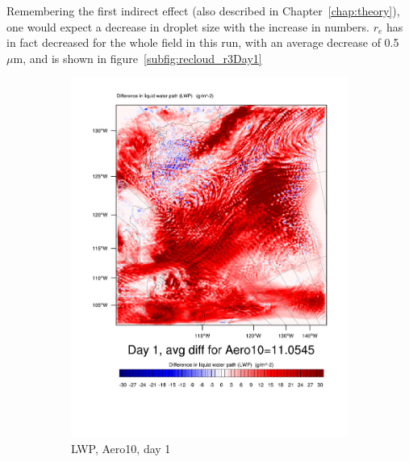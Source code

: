 Remembering the first indirect effect (also described in Chapter~\ref{chap:theory}), one would expect a decrease in droplet size with the increase in numbers. $r_e$ has in fact decreased for the whole field in this run, with an average decrease of 0.5~$\mu\text{m}$, and is shown in figure~\ref{subfig:recloud_r3Day1}

\begin{figure}[hb]
\centering
	\begin{subfigure}{0.48\textwidth}
		\centering
		\includegraphics[width=\textwidth]{results/aero10/Diff_LWP_Day1Aero10.pdf}
		\caption{LWP, Aero10, day 1}
		\label{subfig:LWPr3Day1}
	\end{subfigure}
	\quad
	\begin{subfigure}{0.48\textwidth}
		\centering

\end{subfigure}
\end{figure}
